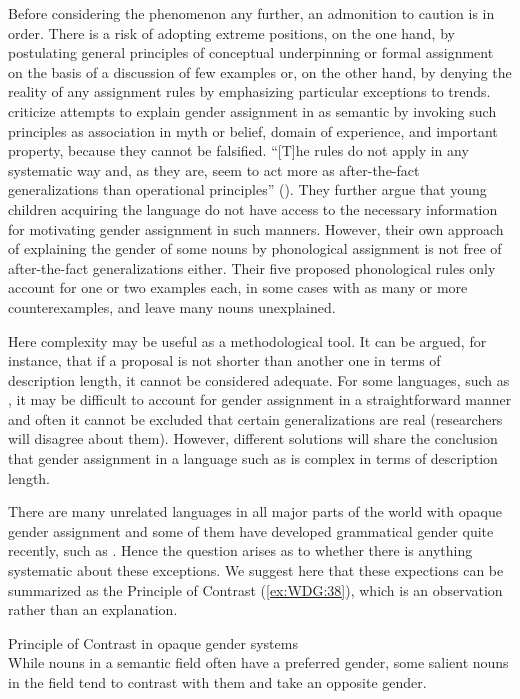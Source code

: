 \documentclass[output=collectionpaper]{langsci/langscibook}
\begin{document}
Before considering the phenomenon any further, an admonition to caution is in order. There is a risk of adopting extreme positions, on the one hand, by postulating general principles of conceptual underpinning or formal assignment on the basis of a discussion of few examples or, on the other hand, by denying the reality of any assignment rules by emphasizing particular exceptions to trends. \cite{Plaster2007} criticize attempts to explain gender assignment in  as semantic by invoking such principles as association in myth or belief, domain of experience, and important property, because they cannot be falsified. ``[T]he rules do not apply in any systematic way and, as they are, seem to act more as after-the-fact generalizations than operational principles'' (\citealt[6]{Plaster2007}). They further argue that young children acquiring the language do not have access to the necessary information for motivating gender assignment in such manners. However, their own approach of explaining the gender of some  nouns by phonological assignment is not free of after-the-fact generalizations either. Their five proposed phonological rules only account for one or two examples each, in some cases with as many or more counterexamples, and leave many nouns unexplained.

Here complexity may be useful as a methodological tool. It can be argued, for instance, that if a proposal is not shorter than another one in terms of description length, it cannot be considered adequate. For some languages, such as , it may be difficult to account for gender assignment in a straightforward manner and often it cannot be excluded that certain generalizations are real (researchers will disagree about them). However, different solutions will share the conclusion that gender assignment in a language such as  is complex in terms of description length.

There are many unrelated languages in all major parts of the world with opaque gender assignment and some of them have developed grammatical gender quite recently, such as . Hence the question arises as to whether there is anything systematic about these exceptions. We suggest here that these expections can be summarized as the Principle of Contrast (\ref{ex:WDG:38}), which is an observation rather than an explanation.

\ea\label{ex:WDG:38}
Principle of Contrast in opaque gender systems \\
While nouns in a semantic field often have a preferred gender, some salient nouns in the field tend to contrast with them and take an opposite gender.
\z
\end{document}
